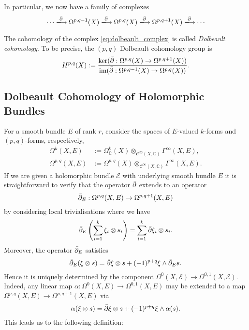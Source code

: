 \documentclass[12pt]{ociamthesis}  %
\begin{document}
In particular, we now have a family of complexes
\begin{align}\label{eq:dolbeault_complex}
  \cdots \xlongrightarrow\dol
  \Omega^{p,q-1}(X)\xlongrightarrow\dol
  \Omega^{p,q}(X)\xlongrightarrow\dol
  \Omega^{p,q+1}(X)\xlongrightarrow\dol
  \cdots
\end{align}
\begin{definition}
  The cohomology of the complex \ref{eq:dolbeault_complex} is
  called \emph{Dolbeault cohomology}. To be precise, the
  $(p,q)$ Dolbeault cohomology group is
  \begin{align*}
    H^{p,q}(X) := \frac{
      \ker({\bar{\partial}} : \Omega^{p,q}(X) \to \Omega^{p,q+1}(X))
    }{
      \operatorname{im}({\bar{\partial}} : \Omega^{p,q-1}(X) \to \Omega^{p,q}(X))
    }.
  \end{align*}
\end{definition}

\subsection{Dolbeault Cohomology of Holomorphic Bundles}

For a smooth bundle $E$ of rank $r$, consider the spaces of
$E$-valued $k$-forms and $(p,q)$-forms, respectively,
\begin{align*}
  \Omega^k(X,E)     & := \Omega^k_{\mathbb C}(X)\otimes_{\mathscr C^\infty(X,\mathbb C)}\Gamma^\infty(X,E), \\
  \Omega^{p,q}(X,E) & := \Omega^{p,q}(X)\otimes_{\mathscr C^\infty(X,\mathbb C)}\Gamma^\infty(X,E).
\end{align*}
If we are given a holomorphic bundle $\mathcal E$ with underlying
smooth bundle $E$
it is straightforward to verify that the operator ${\bar{\partial}}$ extends
to an operator
\begin{align}\label{eq:general_dolbeault_operator}
  {\bar{\partial}}_E : \Omega^{p,q}(X,E) \to \Omega^{p,q+1}(X,E)
\end{align}
by considering local trivialisations where we have
\begin{align*}
  {\bar{\partial}}_E \left({\sum_{i=1}^k \xi_i \otimes s_i}\right)
  = \sum_{i=1}^k {\bar{\partial}} \xi_i \otimes s_i.
\end{align*}
Moreover, the operator ${\bar{\partial}}_E$ satisfies
\begin{align*}
  {\bar{\partial}}_E(\xi \otimes s) = {\bar{\partial}}\xi \otimes s + (-1)^{p+q} \xi \wedge {\bar{\partial}}_E s.
\end{align*}
Hence it is uniquely determined by the component
$\Omega^0(X,\mathcal E) \to \Omega^{0,1}(X,\mathcal E)$. Indeed,
any linear map $\alpha : \Omega^0(X,E) \to \Omega^{0,1}(X,E)$ may be
extended to a map $\Omega^{p,q}(X,E) \to \Omega^{p,q+1}(X,E)$
via
\begin{align}\label{eq:leibniz_extension}
  \alpha(\xi \otimes s) = {\bar{\partial}}\xi \otimes s + (-1)^{p+q}\xi\wedge \alpha(s).
\end{align}
This leads us to the following definition:
\end{document}
